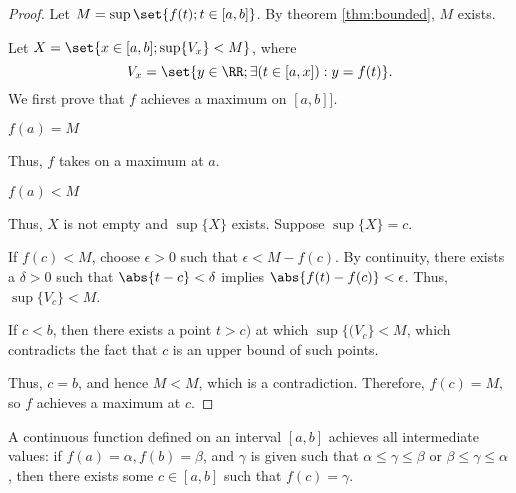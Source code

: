 \documentclass[11pt]{scrartcl}
\begin{document}
\begin{proof}
  Let \(M=\sup \set{f(t); t\in[a,b]}\). By theorem \ref{thm:bounded},
  \(M\) exists. \vs

  Let \(X=\set{x\in[a,b];\sup\{V_{x}\} < M}\), where
  \[V_{x}=\set{y\in\RR ; \exists (t\in[a,x]):y = f(t)}.\]
  We first prove that \(f\) achieves a maximum on \([a,b]\)].
  \begin{case*}[\textbf{1}]
    \(f(a) = M\)
  \end{case*}
  Thus, \(f\) takes on a maximum at \(a\).
  \begin{case*}[2]
    \(f(a)< M\)
  \end{case*}
  Thus, \(X\) is not empty and \(\sup\{X\}\) exists. Suppose  \(\sup\{X\}=c\). \vs

  If \(f(c)<M\), choose \(\epsilon >0\) such that \(\epsilon < M-f(c)\). By continuity,
  there exists a \(\delta>0\) such that \(\abs{t-c}<\delta\) implies
  \(\abs{f(t)-f(c)}<\epsilon\). Thus, \(\sup\{V_{c}\}<M\). \vs

  If \(c<b\), then there exists a point \(t>c)\) at which
  \(\sup\{(V_{c}\} < M\), which contradicts the fact that \(c\) is an
  upper bound of such points. \vs

  Thus, \(c=b\), and hence \(M<M\), which is a
  contradiction. Therefore, \(f(c) = M\), so \(f\) achieves a maximum
  at \(c\).

  

  
\end{proof}
\begin{theorem}
  A continuous function defined on an interval \([a,b]\) achieves all
  intermediate values: if \(f(a)=\alpha, f(b)=\beta \), and \(\gamma\)
  is given such that \(\alpha \leq \gamma \leq \beta\) or
  \(\beta \leq \gamma \leq \alpha\) , then there exists some
  \(c\in[a,b]\) such that \(f(c) = \gamma\).
\end{theorem}
\end{document}
